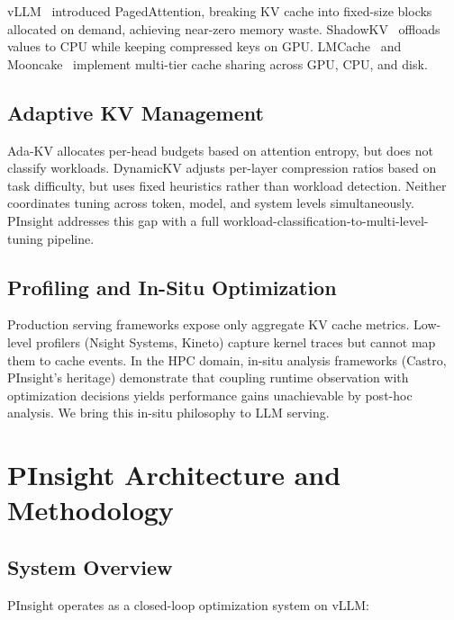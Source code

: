 \documentclass[conference]{IEEEtran}
\begin{document}
vLLM~\cite{vllm} introduced PagedAttention, breaking KV cache into fixed-size blocks allocated on demand, achieving near-zero memory waste. ShadowKV~\cite{shadowkv} offloads values to CPU while keeping compressed keys on GPU. LMCache~\cite{lmcache} and Mooncake~\cite{mooncake} implement multi-tier cache sharing across GPU, CPU, and disk.

\subsection{Adaptive KV Management}

Ada-KV allocates per-head budgets based on attention entropy, but does not classify workloads. DynamicKV adjusts per-layer compression ratios based on task difficulty, but uses fixed heuristics rather than workload detection. Neither coordinates tuning across token, model, and system levels simultaneously. PInsight addresses this gap with a full workload-classification-to-multi-level-tuning pipeline.

\subsection{Profiling and In-Situ Optimization}

Production serving frameworks expose only aggregate KV cache metrics. Low-level profilers (Nsight Systems, Kineto) capture kernel traces but cannot map them to cache events. In the HPC domain, in-situ analysis frameworks (Castro, PInsight's heritage) demonstrate that coupling runtime observation with optimization decisions yields performance gains unachievable by post-hoc analysis. We bring this in-situ philosophy to LLM serving.

\section{PInsight Architecture and Methodology}

\subsection{System Overview}

PInsight operates as a closed-loop optimization system on vLLM:
\end{document}
